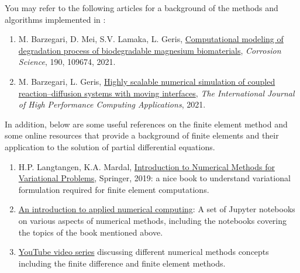 You may refer to the following articles for a background of the methods and algorithms implemented in \biodeg:

\begin{enumerate}
\item
M. Barzegari, D. Mei, S.V. Lamaka, L. Geris, \href{https://doi.org/10.1016/j.corsci.2021.109674}{Computational modeling of degradation process of biodegradable magnesium biomaterials}, \emph{Corrosion Science}, 190, 109674, 2021.
\item
M. Barzegari, L. Geris, \href{https://doi.org/10.1177/10943420211045939}{Highly scalable numerical simulation of coupled reaction–diffusion systems with moving interfaces}, \emph{The International Journal of High Performance Computing Applications}, 2021.
\end{enumerate}

\noindent In addition, below are some useful references on the finite element method and some online resources that provide a background of finite elements and their application to the solution of partial differential equations.

\begin{enumerate}
\item
H.P. Langtangen, K.A. Mardal, \href{https://link.springer.com/book/10.1007/978-3-030-23788-2}{Introduction to Numerical Methods for Variational Problems}, Springer, 2019: a nice book to understand variational formulation required for finite element computations.
\item
\href{https://github.com/TuxRiders/numerical-computing-intro}{An introduction to applied numerical computing}: A set of Jupyter notebooks on various aspects of numerical methods, including the notebooks covering the topics of the book mentioned above.
\item
\href{https://www.youtube.com/playlist?list=PL6fjYEpJFi7UMDXtNiaF3eLlOKAM8Lrkf}{YouTube video series} discussing different numerical methods concepts including the finite difference and finite element methods.
\end{enumerate}



